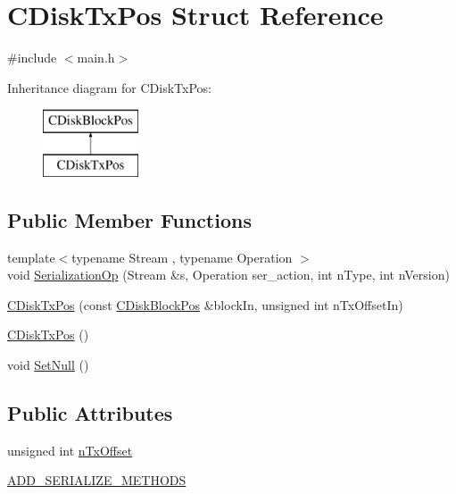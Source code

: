 \hypertarget{struct_c_disk_tx_pos}{}\section{C\+Disk\+Tx\+Pos Struct Reference}
\label{struct_c_disk_tx_pos}


{\ttfamily \#include $<$main.\+h$>$}

Inheritance diagram for C\+Disk\+Tx\+Pos\+:\begin{figure}[H]
\begin{center}
\leavevmode
\includegraphics[height=2.000000cm]{struct_c_disk_tx_pos}
\end{center}
\end{figure}
\subsection*{Public Member Functions}
\begin{DoxyCompactItemize}
\item 
{\footnotesize template$<$typename Stream , typename Operation $>$ }\\void \mbox{\hyperlink{struct_c_disk_tx_pos_a1a68f1de894f0791a7ad64e3e6ea6fd6}{Serialization\+Op}} (Stream \&s, Operation ser\+\_\+action, int n\+Type, int n\+Version)
\item 
\mbox{\hyperlink{struct_c_disk_tx_pos_ab823a4c83ec90c8223544051f11e65fd}{C\+Disk\+Tx\+Pos}} (const \mbox{\hyperlink{struct_c_disk_block_pos}{C\+Disk\+Block\+Pos}} \&block\+In, unsigned int n\+Tx\+Offset\+In)
\item 
\mbox{\hyperlink{struct_c_disk_tx_pos_a2026598d28ffcadfd40452f702bcac46}{C\+Disk\+Tx\+Pos}} ()
\item 
void \mbox{\hyperlink{struct_c_disk_tx_pos_a22eb47d077f9c355373772eb42853fcf}{Set\+Null}} ()
\end{DoxyCompactItemize}
\subsection*{Public Attributes}
\begin{DoxyCompactItemize}
\item 
unsigned int \mbox{\hyperlink{struct_c_disk_tx_pos_af19fa085a69ba3bac7b52413a37adf23}{n\+Tx\+Offset}}
\item 
\mbox{\hyperlink{struct_c_disk_tx_pos_a2990c083fbbd0fb5f5aa4115e540cd21}{A\+D\+D\+\_\+\+S\+E\+R\+I\+A\+L\+I\+Z\+E\+\_\+\+M\+E\+T\+H\+O\+DS}}
\end{DoxyCompactItemize}


